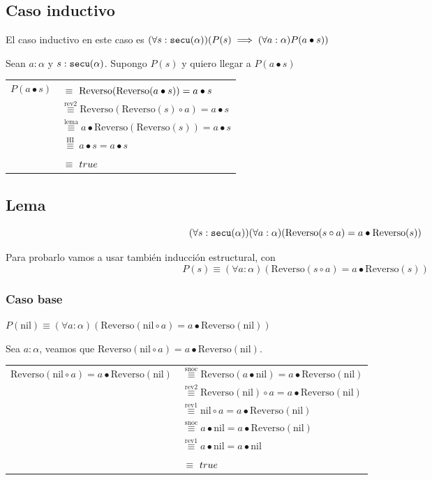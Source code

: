 \documentclass[hidelinks,a4paper,10pt, nofootinbib]{article}
\newcommand{\secu}{\ensuremath\texttt{secu}(\alpha)}
\newcommand{\rev}{\text{Reverso}}
\newcommand{\cons}{\bullet}
\newcommand{\snoc}{\circ}
\newcommand{\nil}{\text{nil}}
\newcommand{\por}[1]{\overset{\text{#1}}{\equiv}}
\newcommand{\ph}{\phantom{rev1}}
\begin{document}
\subsection*{Caso inductivo}
El caso inductivo en este caso es $(\forall s : \secu) (P(s) \implies (\forall a : \alpha) P(a \cons s))$

Sean $a : \alpha$ y $s : \secu$. Supongo $P(s)$ y quiero llegar a $P(a \cons s)$

\begin{center}
\begin{tabular}{c l}
$P(a \cons s)$ & $\por{\ph} \rev(\rev(a \cons s)) = a \cons s$ \\
               & $\por{rev2} \rev(\rev(s) \circ a) = a \cons s$ \\
               & $\por{lema} a \cons \rev(\rev(s)) = a \cons s$ \\
               & $\por{ HI } a \cons s = a \cons s$ \\ 
               & $\por{\ph} true$ \\
\end{tabular}
\end{center}

\subsection*{Lema}

\[(\forall s : \secu) (\forall a : \alpha) (\rev(s \circ a) = a \cons \rev(s))\]

Para probarlo vamos a usar también inducción estructural, con 
\[P(s) \equiv (\forall a : \alpha) (\rev(s \circ a) = a \cons \rev(s))\]

\subsubsection*{Caso base}
$P(\nil) \equiv (\forall a : \alpha) (\rev(\nil \circ a) = a \cons \rev(\nil))$

Sea $ a : \alpha$, veamos que $  \rev(\nil \circ a) = a \cons \rev(\nil)$.

\begin{center}
\begin{tabular}{r l}
$\rev(\nil \circ a) = a \cons \rev(\nil)$ & $\por{snoc} \rev(a \cons \nil) = a \cons \rev(\nil)$ \\
               & $\por{rev2} \rev(\nil) \snoc a = a \cons \rev(\nil)$ \\
               & $\por{rev1} \nil \snoc a = a \cons \rev(\nil)$ \\
               & $\por{snoc} a \cons \nil = a \cons \rev(\nil)$ \\ 
               & $\por{rev1} a \cons \nil = a \cons \nil$ \\ 
               & $\por{\ph} true$ \\
\end{tabular}
\end{center}
\end{document}
